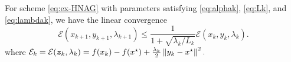 \documentclass[10pt]{amsart}
\begin{document}
\begin{theorem}
	\label{lem:conv-ex1-ode-NAG}
	For scheme \eqref{eq:ex-HNAG} with parameters satisfying \eqref{eq:alphak}, \eqref{eq:Lk}, and \eqref{eq:lambdak},  we have the linear convergence
	\begin{equation}\label{eq:conv1-ex1-ode-NAG}
\mathcal E(x_{k+1}, y_{k+1}, \lambda_{k+1}) \leq \frac{1}{1+ \sqrt{\lambda_k/L_k}} \mathcal E(x_{k}, y_{k}, \lambda_{k}). 
	\end{equation}
	where $\mathcal E_k = \mathcal E(\boldsymbol z_k, \lambda_k)
	= {}f(x_k)-f(x^{\star}) + \frac{\lambda_k}{2} \left\lVert {y_k-x^{\star}} \right\rVert^2.$
\end{theorem}
\end{document}

